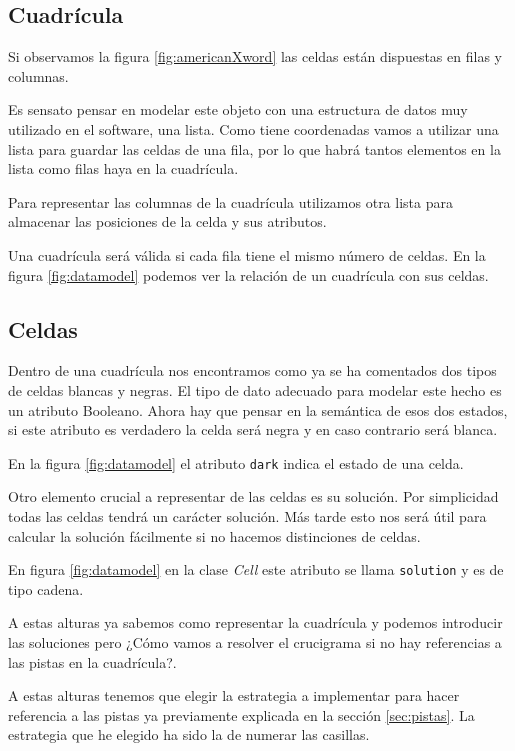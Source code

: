 \documentclass[12pt, a4paper]{article}
\begin{document}
\subsection{Cuadrícula}

Si observamos la figura \ref{fig:americanXword} las celdas están dispuestas en filas
y columnas.

Es sensato pensar en modelar este objeto con una estructura de datos muy utilizado
en el software, una lista. Como tiene coordenadas vamos a utilizar
una lista para guardar las celdas de una fila, por lo que habrá tantos elementos
en la lista como filas haya en la cuadrícula.

Para representar las columnas de la cuadrícula utilizamos otra lista para almacenar
las posiciones de la celda y sus atributos.

Una cuadrícula será válida si cada fila tiene el mismo número de celdas. En la figura
\ref{fig:datamodel} podemos ver la relación de un cuadrícula con sus celdas.

\subsection{Celdas} 

Dentro de una cuadrícula nos encontramos como ya se ha comentados dos tipos de celdas
blancas y negras. El tipo de dato adecuado para modelar este hecho es un atributo
Booleano. Ahora hay que pensar en la semántica de esos dos estados, si este atributo
es verdadero la celda será negra y en caso contrario será blanca.

En la figura \ref{fig:datamodel} el atributo \verb*|dark| indica el estado de una celda.

Otro elemento crucial a representar de las celdas es su solución. Por simplicidad
todas las celdas tendrá un carácter solución. Más tarde esto nos será útil para
calcular la solución fácilmente si no hacemos distinciones de celdas.

En figura \ref{fig:datamodel} en la clase \textit{Cell} este atributo se llama
\verb*|solution| y es de tipo cadena.

A estas alturas ya sabemos como representar la cuadrícula y podemos introducir
las soluciones pero ¿Cómo vamos a resolver el crucigrama si no hay referencias
a las pistas en la cuadrícula?.

A estas alturas tenemos que elegir la estrategia a implementar para hacer referencia
a las pistas ya previamente explicada en la sección \ref{sec:pistas}. La estrategia
que he elegido ha sido la de numerar las casillas.
\end{document}
